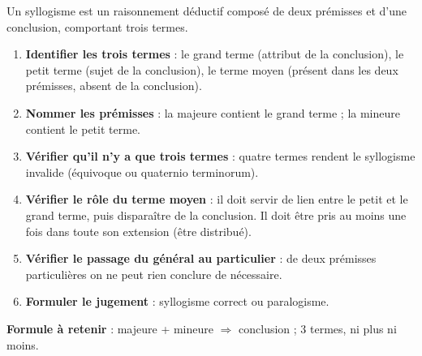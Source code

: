 \documentclass[11pt]{article}
\newcommand{\cle}[1]{{\popxbold\color{popdark}#1}}
\begin{document}
\begin{methode}
Un \cle{syllogisme} est un raisonnement déductif composé de deux prémisses et d'une conclusion, comportant trois termes.
\begin{enumerate}
\item \textbf{Identifier les trois termes} : le \cle{grand terme} (attribut de la conclusion), le \cle{petit terme} (sujet de la conclusion), le \cle{terme moyen} (présent dans les deux prémisses, absent de la conclusion).
\item \textbf{Nommer les prémisses} : la \cle{majeure} contient le grand terme ; la \cle{mineure} contient le petit terme.
\item \textbf{Vérifier qu'il n'y a que trois termes} : quatre termes rendent le syllogisme invalide (équivoque ou quaternio terminorum).
\item \textbf{Vérifier le rôle du terme moyen} : il doit servir de lien entre le petit et le grand terme, puis disparaître de la conclusion. Il doit être pris au moins une fois dans toute son extension (être distribué).
\item \textbf{Vérifier le passage du général au particulier} : de deux prémisses particulières on ne peut rien conclure de nécessaire.
\item \textbf{Formuler le jugement} : syllogisme correct ou paralogisme.
\end{enumerate}
\textbf{Formule à retenir} : majeure + mineure $\Rightarrow$ conclusion ; 3 termes, ni plus ni moins.
\end{methode}
\end{document}
